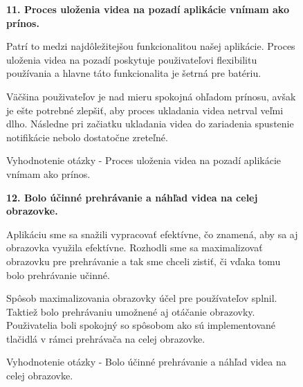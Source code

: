 \begin{figure}[H]
\textbf{11. Proces uloženia videa na pozadí aplikácie vnímam ako prínos.}

Patrí to medzi najdôležitejšou funkcionalitou našej aplikácie. Proces uloženia videa na pozadí poskytuje použivateľovi flexibilitu používania a hlavne táto funkcionalita je šetrná pre batériu.

Väčšina použivateľov je nad mieru spokojná ohľadom prínosu, avšak je ešte potrebné zlepšiť, aby proces ukladania videa netrval veľmi dlho. Následne pri začiatku ukladania videa do zariadenia spustenie notifikácie nebolo dostatočne zreteľné.

\caption{Vyhodnotenie otázky - Proces uloženia videa na pozadí aplikácie vnímam ako prínos.}
\end{figure}


\begin{figure}[H]
\textbf{12. Bolo účinné prehrávanie a náhľad videa na celej obrazovke.}

Aplikáciu sme sa snažili vypracovať efektívne, čo znamená, aby sa aj obrazovka využila efektívne. Rozhodli sme sa maximalizovať obrazovku pre prehrávanie a tak sme chceli zistiť, či vďaka tomu bolo prehrávanie učinné.

Spôsob maximalizovania obrazovky účel pre používateľov splnil. Taktiež bolo prehrávaniu umožnené aj otáčanie obrazovky. Použivatelia boli spokojný so spôsobom ako sú implementované tlačidlá v rámci prehrávača na celej obrazovke.

\caption{Vyhodnotenie otázky - Bolo účinné prehrávanie a náhľad videa na celej obrazovke. }
\end{figure}


